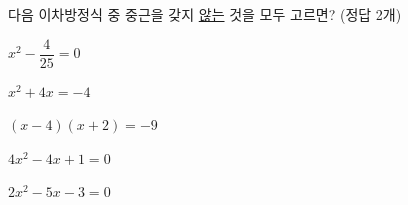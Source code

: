 다음 이차방정식 중 중근을 갖지 \underline{않는} 것을 모두 고르면? (정답 2개)
\begin{choicesii}{\rule[-3ex]{0pt}{8ex}$x^2-\dfrac{4}{25}=0$}{\rule[-3ex]{0pt}{8ex}$x^2+4x=-4$}{\rule[-3ex]{0pt}{8ex}$(x-4)(x+2)=-9$}{\rule[-3ex]{0pt}{8ex}$4x^2-4x+1=0$}{\rule[-3ex]{0pt}{8ex}$2x^2-5x-3=0$}\end{choicesii}
